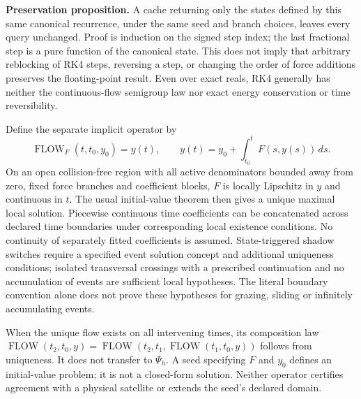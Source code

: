 \textbf{Preservation proposition.} A cache returning only the states defined by
this same canonical recurrence, under the same seed and branch choices, leaves
every query unchanged. Proof is induction on the signed step index; the last
fractional step is a pure function of the canonical state. This does not imply
that arbitrary reblocking of RK4 steps, reversing a step, or changing the order
of force additions preserves the floating-point result. Even over exact reals,
RK4 generally has neither the continuous-flow semigroup law nor exact energy
conservation or time reversibility.

Define the separate implicit operator by
\begin{equation}
 \operatorname{FLOW}_F(t,t_0,y_0)=y(t),\qquad
 y(t)=y_0+\int_{t_0}^{t}F(s,y(s))\,ds .
\end{equation}
On an open collision-free region with all active denominators bounded away
from zero, fixed force branches and coefficient blocks, $F$ is locally Lipschitz
in $y$ and continuous in $t$. The usual initial-value theorem then gives a
unique maximal local solution. Piecewise continuous time coefficients can be
concatenated across declared time boundaries under corresponding local
existence conditions. No continuity of separately fitted coefficients is
assumed. State-triggered shadow switches require a specified event solution
concept and additional uniqueness conditions; isolated transversal crossings
with a prescribed continuation and no accumulation of events are sufficient
local hypotheses. The literal boundary convention alone does not prove these
hypotheses for grazing, sliding or infinitely accumulating events.

When the unique flow exists on all intervening times, its composition law
$\operatorname{FLOW}(t_2,t_0,y)=\operatorname{FLOW}(t_2,t_1,
\operatorname{FLOW}(t_1,t_0,y))$ follows from uniqueness. It does not transfer to
$\Psi_h$. A seed specifying $F$ and $y_0$ defines an initial-value problem; it
is not a closed-form solution. Neither operator certifies agreement with a
physical satellite or extends the seed's declared domain.


